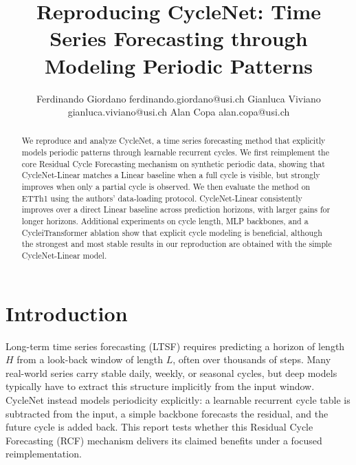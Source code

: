\documentclass[10pt]{article}
\title{Reproducing CycleNet: Time Series Forecasting through Modeling Periodic Patterns}
\author{%
  \name Ferdinando Giordano \email ferdinando.giordano@usi.ch
  \AND
  \name Gianluca Viviano \email gianluca.viviano@usi.ch
  \AND
  \name Alan Copa \email alan.copa@usi.ch
}
\begin{document}
\maketitle

\begin{abstract}
We reproduce and analyze CycleNet, a time series forecasting method that explicitly models periodic patterns through learnable recurrent cycles. We first reimplement the core Residual Cycle Forecasting mechanism on synthetic periodic data, showing that CycleNet-Linear matches a Linear baseline when a full cycle is visible, but strongly improves when only a partial cycle is observed. We then evaluate the method on ETTh1 using the authors' data-loading protocol. CycleNet-Linear consistently improves over a direct Linear baseline across prediction horizons, with larger gains for longer horizons. Additional experiments on cycle length, MLP backbones, and a CycleiTransformer ablation show that explicit cycle modeling is beneficial, although the strongest and most stable results in our reproduction are obtained with the simple CycleNet-Linear model.
\end{abstract}

\section{Introduction}
Long-term time series forecasting (LTSF) requires predicting a horizon of length $H$ from a look-back window of length $L$, often over thousands of steps. Many real-world series carry stable daily, weekly, or seasonal cycles, but deep models typically have to extract this structure implicitly from the input window. CycleNet \citep{lin2024cyclenet} instead models periodicity explicitly: a learnable recurrent cycle table is subtracted from the input, a simple backbone forecasts the residual, and the future cycle is added back. This report tests whether this Residual Cycle Forecasting (RCF) mechanism delivers its claimed benefits under a focused reimplementation.
\end{document}
